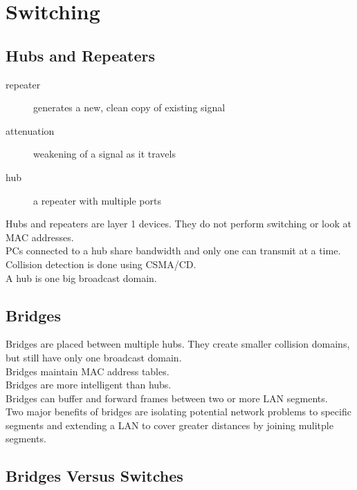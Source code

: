 \section{Switching}

\subsection{Hubs and Repeaters}

\begin{description}

\item[repeater]
generates a new, clean copy of existing signal

\item[attenuation]
weakening of a signal as it travels

\item[hub]
a repeater with multiple ports

\end{description}

Hubs and repeaters are layer 1 devices. They do not perform switching or look
at MAC addresses.\\

PCs connected to a hub share bandwidth and only one can transmit at a time.
Collision detection is done using CSMA/CD.\\

A hub is one big broadcast domain.

\subsection{Bridges}

Bridges are placed between multiple hubs. They create smaller collision
domains, but still have only one broadcast domain.\\

Bridges maintain MAC address tables.\\

Bridges are more intelligent than hubs.\\

Bridges can buffer and forward frames between two or more LAN segments.\\

Two major benefits of bridges are isolating potential network problems to
specific segments and extending a LAN to cover greater distances by joining
mulitple segments.

\subsection{Bridges Versus Switches}

